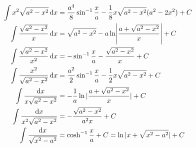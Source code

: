 \begin{align}
 \int x^{2}\sqrt{a^{2}-x^{2}}\dif{x}&=\frac{a^{4}}{8}\sin^{-1}\frac{x}{a}-\frac{1}{8}x\sqrt{a^{2}-x^{2}}(a^{2}-2x^{2})+C\\
\int\frac{\sqrt{a^{2}-x^{2}}}{x}\dif x&=\sqrt{a^{2}-x^{2}}-a\ln\abs{\frac{a+\sqrt{a^{2}-x^{2}}}{x}}+C\\
\int\frac{\sqrt{a^{2}-x^{2}}}{x^2}\dif x&=-\sin^{-1}\frac{x}{a}-\frac{\sqrt{a^2-x^2}}{x}+C\\
\int\frac{x^2}{\sqrt{a^{2}-x^{2}}}\dif x&=\frac{a^2}{2}\sin^{-1}\frac{x}{a}-\frac{1}{2}x\sqrt{a^{2}-x^{2}}+C\label{مساوات_جدول_تکمل_تینتیس}\\
\int\frac{\dif x}{x\sqrt{a^{2}-x^{2}}}&=-\frac{1}{a}\ln|\frac{a+\sqrt{a^{2}-x^{2}}}{x}|+C\\
\int\frac{\dif x}{x^{2}\sqrt{a^{2}-x^{2}}}&=-\frac{\sqrt{a^{2}-x^{2}}}{a^{2}x}+C\\
\int\frac{\dif x}{\sqrt{x^{2}-a^{2}}}&=\cosh^{-1}\frac{x}{a}+C=\ln|x+\sqrt{x^{2}-a^{2}}|+C
\end{align}

